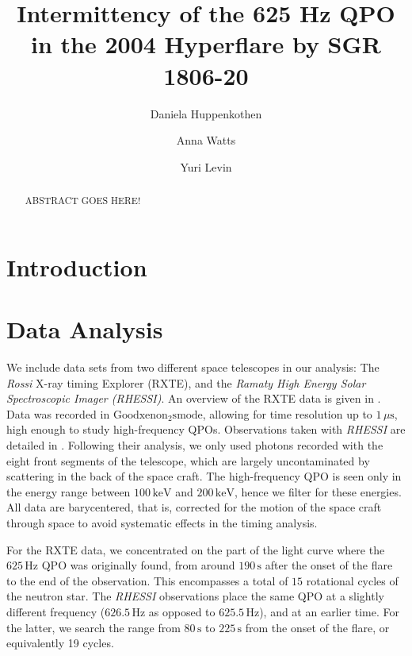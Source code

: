 \documentclass{emulateapj}
\begin{document}
\title{Intermittency of the 625 Hz QPO in the 2004 Hyperflare by SGR 1806-20}
\author{Daniela Huppenkothen}
\author{Anna Watts}
\author{Yuri Levin}

\begin{abstract}
ABSTRACT GOES HERE!
\end{abstract} 

\section{Introduction}
\label{sec:introduction}


\section{Data Analysis}
\label{sec:analysis}

We include data sets from two different space telescopes in our analysis: The {\it Rossi} X-ray timing Explorer (RXTE), and the {\it Ramaty High Energy Solar Spectroscopic Imager (RHESSI)}. An overview of the RXTE data is given in \citep{israel05}. Data was recorded in $\mathrm{Goodxenon_2s mode}$, allowing for time resolution up to $1 \, \mu \mathrm{s}$, high enough to study high-frequency QPOs.
Observations taken with {\it RHESSI} are detailed in \citep{watts06}. Following their analysis, we only used photons recorded with the eight front segments of the telescope, which are largely uncontaminated by scattering in the back of the space craft. The high-frequency QPO is seen only in the energy range between $100 \, \mathrm{keV}$ and $200 \, \mathrm{keV}$, hence we filter for these energies. All data are barycentered, that is, corrected for the motion of the space craft through space to avoid systematic effects in the timing analysis.

For the RXTE data, we concentrated on the part of the light curve where the $625 \, \mathrm{Hz}$ QPO was originally found, from around $190\, \mathrm{s}$ after the onset of the flare to the end of the observation. This encompasses a total of $15$ rotational cycles of the neutron star. The {\it RHESSI} observations place the same QPO at a slightly different frequency ($626.5 \, \mathrm{Hz}$ as opposed to $625.5 \, \mathrm{Hz}$), and at an earlier time. For the latter, we search the range from $80\, \mathrm{s}$ to $225 \, \mathrm{s}$ from the onset of the flare, or equivalently 19 cycles.
\end{document}
